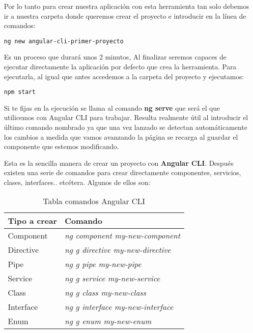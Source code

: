 
Por lo tanto para crear nuestra aplicación con esta herramienta tan solo debemos ir a nuestra carpeta donde queremos crear el proyecto e introducir en la línea de comandos: 
	\lstset{language=C, breaklines=true, basicstyle=\footnotesize}
		\begin{lstlisting}[frame=single]
		ng new angular-cli-primer-proyecto
    	\end{lstlisting}
 
 Es un proceso que durará unos 2 minutos,  Al finalizar seremos capaces de ejecutar directamente la aplicación por defecto que crea la herramienta. Para ejecutarla, al igual que antes accedemos a la carpeta del proyecto y ejecutamos:
 	\lstset{language=C, breaklines=true, basicstyle=\footnotesize}
		\begin{lstlisting}[frame=single]
		 npm start
    	\end{lstlisting}
    	
    	
 Si te fijas en la ejecución se llama al comando \textbf{ng serve} que será el que utilicemos con Angular CLI para trabajar. Resulta realmente útil al introducir el último comando nombrado ya que una vez lanzado se detectan automáticamente los cambios a medida que vamos avanzando la página se recarga al guardar el componente que estemos modificando.  
    	
    	
   Esta es la sencilla manera de crear un proyecto con \textbf{Angular CLI}. Después existen una serie de comandos para crear directamente componentes, servicios, clases, interfaces.. etcétera.  Algunos de ellos son:
   
   
\begin{table}[htbp]
\begin{center}
\begin{tabular}{|l|l|}
\hline
Tipo a crear & Comando  \\
\hline \hline
Component & \emph{ng component my-new-component}  \\ \hline
Directive & \emph{ng g directive my-new-directive}  \\ \hline
Pipe & \emph{ng g pipe my-new-pipe}  \\ \hline
Service & \emph{ng g service my-new-service}  \\ \hline
Class & \emph{ng g class my-new-class}  \\ \hline
Interface & \emph{ng g interface my-new-interface}  \\ \hline
Enum & \emph{ng g enum my-new-enum}  \\ \hline
\end{tabular}
\caption{Tabla comandos Angular CLI}
\label{tabla:sencilla}
\end{center}
\end{table}
   


